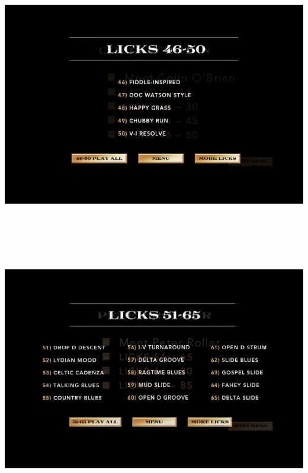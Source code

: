 \documentclass[a4paper]{book}
\begin{document}
\begin{center}
\includegraphics[width=17cm,height=11.333cm]{lebluessupportsmethodes-img4.png}
\end{center}
\clearpage

\begin{center}
\includegraphics[width=17cm,height=11.333cm]{lebluessupportsmethodes-img5.png}
\end{center}
\end{document}
